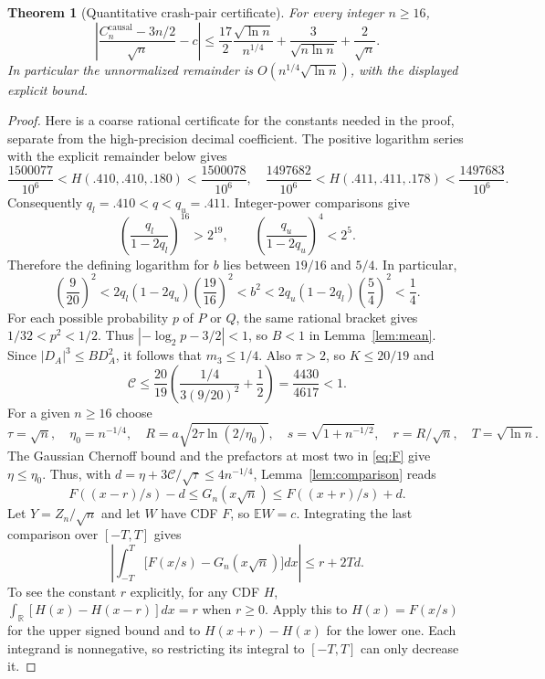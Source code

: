 \documentclass[11pt,a4paper]{article}
\newtheorem{theorem}{Theorem}
\newcommand{\E}{\mathbb E}
\newcommand{\causal}{\mathrm{causal}}
\newcommand{\R}{\mathbb R}
\begin{document}
\begin{theorem}[Quantitative crash-pair certificate]\label{thm:finite}
For every integer $n\ge16$,
\begin{equation}\label{eq:finite}
\boxed{\left|\frac{C_n^{\causal}-3n/2}{\sqrt n}-c\right|
\le \frac{17}{2}\frac{\sqrt{\ln n}}{n^{1/4}}
+\frac{3}{\sqrt{n\ln n}}+\frac{2}{\sqrt n}.}
\end{equation}
In particular the unnormalized remainder is
$O(n^{1/4}\sqrt{\ln n})$, with the displayed explicit bound.
\end{theorem}
\begin{proof}
Here is a coarse rational certificate for the constants needed in the
proof, separate from the high-precision decimal coefficient. The positive
logarithm series with the explicit remainder below gives
\[
\frac{1500077}{10^6}<H(.410,.410,.180)<\frac{1500078}{10^6},
\quad
\frac{1497682}{10^6}<H(.411,.411,.178)<\frac{1497683}{10^6}.
\]
Consequently $q_l=.410<q<q_u=.411$. Integer-power comparisons give
\[
\left(\frac{q_l}{1-2q_l}\right)^{16}>2^{19},\qquad
\left(\frac{q_u}{1-2q_u}\right)^4<2^5.
\]
Therefore the defining logarithm for $b$ lies between $19/16$ and $5/4$.
In particular,
\[
\left(\frac9{20}\right)^2
<2q_l(1-2q_u)\left(\frac{19}{16}\right)^2
<b^2
<2q_u(1-2q_l)\left(\frac54\right)^2<\frac14.
\]
For each possible probability $p$ of $P$ or $Q$, the same rational
bracket gives $1/32<p^2<1/2$. Thus
$|{-\log_2p}-3/2|<1$, so $B<1$ in Lemma~\ref{lem:mean}. Since
$|D_A|^3\le B D_A^2$, it follows that $m_3\le1/4$. Also $\pi>2$,
so $K\le20/19$ and
\[
\mathcal C\le\frac{20}{19}
\left(\frac{1/4}{3(9/20)^2}+\frac12\right)
=\frac{4430}{4617}<1.
\]
For a given $n\ge16$ choose
\[
\tau=\sqrt n,\quad \eta_0=n^{-1/4},\quad
R=a\sqrt{2\tau\ln(2/\eta_0)},\quad
s=\sqrt{1+n^{-1/2}},\quad r=R/\sqrt n,\quad T=\sqrt{\ln n}.
\]
The Gaussian Chernoff bound and the prefactors at most two in
\eqref{eq:F} give $\eta\le\eta_0$. Thus, with
$d=\eta+3\mathcal C/\sqrt\tau\le4n^{-1/4}$,
Lemma~\ref{lem:comparison} reads
\[
F((x-r)/s)-d\le G_n(x\sqrt n)\le F((x+r)/s)+d.
\]
Let $Y=Z_n/\sqrt n$ and let $W$ have CDF $F$, so $\E W=c$.
Integrating the last comparison over $[-T,T]$ gives
\begin{equation}\label{eq:core}
\left|\int_{-T}^T\bigl[F(x/s)-G_n(x\sqrt n)\bigr]dx\right|
\le r+2Td.
\end{equation}
To see the constant $r$ explicitly, for any CDF $H$,
$\int_{\R}[H(x)-H(x-r)]dx=r$ when $r\ge0$. Apply this to $H(x)=F(x/s)$
for the upper signed bound and to $H(x+r)-H(x)$ for the lower one.
Each integrand is nonnegative, so restricting its integral to
$[-T,T]$ can only decrease it.


\end{proof}
\end{document}
